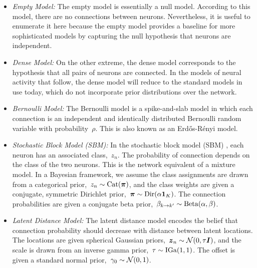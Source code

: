 \begin{itemize}
\item \textit{Empty Model: } The empty model is essentially a null
  model. According to this model, there are no connections between
  neurons. Nevertheless, it is useful to enumerate it here because
  the empty model provides a baseline for more sophisticated models
  by capturing the null hypothesis that neurons are independent. 
  
\item \textit{Dense Model: } On the other extreme, the dense model
  corresponds to the hypothesis that all pairs of neurons are
  connected. In the models of neural activity that follow, the
  dense model will reduce to the standard models in use today, which
  do not incorporate prior distributions over the network.
  
\item \textit{Bernoulli Model: } The Bernoulli model is a
  spike-and-slab model in which each connection is an independent and
  identically distributed Bernoulli random variable with
  probability~$\rho$. This is also known as an Erd\H{o}s-R\'enyi model.
  
\item \textit{Stochastic Block Model (SBM): } In the stochastic block
  model (SBM) \citep{Nowicki-2001}, each neuron has an associated
  class,~$z_n$.  The probability of connection depends on the class of
  the two neurons.  This is the network equivalent of a mixture model.
  In a Bayesian framework, we assume the class assignments are drawn
  from a categorical prior,~${z_n \sim \mathrm{Cat}(\boldsymbol{\pi})}$, and
  the class weights are given a conjugate, symmetric Dirichlet
  prior,~${\boldsymbol{\pi} \sim \mathrm{Dir}(\alpha \boldsymbol{1}_K)}$. The connection
  probabilities are given a conjugate beta prior,~${\beta_{k \to k'}
    \sim \mathrm{Beta}(\alpha, \beta)}$.
  
\item \textit{Latent Distance Model: } The latent distance model
  \citep{Hoff-2008} encodes the belief that connection probability
  should decrease with distance between latent locations. The
  locations are given spherical Gaussian priors,~$\boldsymbol{z}_n \sim
  \mathcal{N}(0, \tau \boldsymbol{I})$, and the scale is drawn from an inverse
  gamma prior,~$\tau \sim \mathrm{IGa}(1,1)$. The offset is given a
  standard normal prior,~$\gamma_0 \sim \mathcal{N}(0, 1)$.

\end{itemize}
